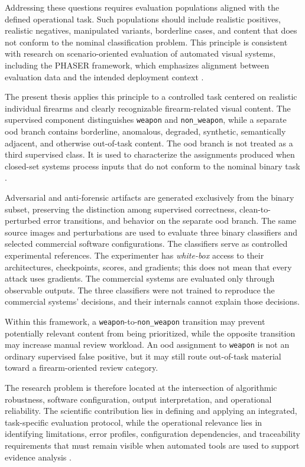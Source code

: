 Addressing these questions requires evaluation populations aligned with the
defined operational task. Such populations should include realistic positives,
realistic negatives, manipulated variants, borderline cases, and content that
does not conform to the nominal classification problem. This principle is
consistent with research on scenario-oriented evaluation of automated visual
systems, including the PHASER framework, which emphasizes alignment between
evaluation data and the intended deployment context
\cite{mckeown2024phaser}.

The present thesis applies this principle to a controlled task centered on
realistic individual firearms and clearly recognizable firearm-related visual
content. The supervised component distinguishes \texttt{weapon} and
\texttt{non\_weapon}, while a separate \gls{ood} branch contains borderline,
anomalous, degraded, synthetic, semantically adjacent, and otherwise out-of-task
content. The \gls{ood} branch is not treated as a third supervised class. It is
used to characterize the assignments produced when closed-set systems process
inputs that do not conform to the nominal binary task
\cite{silva2021microservices,Hao2018DeepFirearm}.

Adversarial and anti-forensic artifacts are generated exclusively from the
binary subset, preserving the distinction among supervised correctness,
clean-to-perturbed error transitions, and behavior on the separate \gls{ood}
branch. The same source images and perturbations are used to evaluate three
binary classifiers and selected commercial software configurations.
The classifiers serve as controlled experimental references. The experimenter
has \textit{white-box} access to their architectures, checkpoints, scores, and
gradients; this does not mean that every attack uses gradients. The commercial
systems are evaluated only through observable outputs. The three classifiers
were not trained to reproduce the commercial systems' decisions, and their
internals cannot explain those decisions.

Within this framework, a \texttt{weapon}-to-\texttt{non\_weapon} transition may
prevent potentially relevant content from being prioritized, while the opposite
transition may increase manual review workload. An \gls{ood} assignment to
\texttt{weapon} is not an ordinary supervised false positive, but it may still
route out-of-task material toward a firearm-oriented review category.

The research problem is therefore located at the intersection of algorithmic
robustness, software configuration, output interpretation, and operational
reliability. The scientific contribution lies in defining and applying an
integrated, task-specific evaluation protocol, while the operational relevance
lies in identifying limitations, error profiles, configuration dependencies,
and traceability requirements that must remain visible when automated tools are
used to support evidence analysis
\cite{silva2021microservices,mckeown2024phaser,sanna2024preliminary,sanna2025pixelperfect}.

